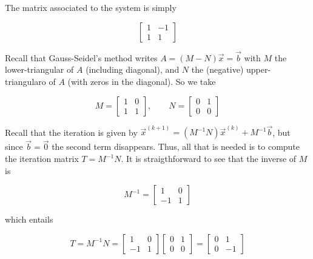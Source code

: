 \documentclass[12pt]{article}
\theoremstyle{definition}
\begin{document}
The matrix associated to the system is simply 

\begin{equation*}
    \begin{bmatrix} 
        1 & -1 \\ 
        1 & 1
    \end{bmatrix} 
\end{equation*}

Recall that Gauss-Seidel's method writes $A = (M-N)\overrightarrow{x} =
\overrightarrow{b}$ with $M$ the lower-triangular of $A$ (including diagonal),
and $N$ the (negative) upper-triangularo of $A$ (with zeros in the diagonal). So we take 

\begin{equation*}
    M = \begin{bmatrix} 
        1 & 0 \\ 
        1 & 1
    \end{bmatrix}, \qquad N = \begin{bmatrix} 
        0 & 1 \\ 
        0 & 0
    \end{bmatrix} 
\end{equation*}

Recall that the iteration is given by $\overrightarrow{x}^{(k+1)} = (M^{-1}
N)\overrightarrow{x}^{(k)} + M^{-1}\overrightarrow{b}$, but since
$\overrightarrow{b} = \overrightarrow{0}$ the second term disappears. Thus, all
that is needed is to compute the iteration matrix $T = M^{-1}N$. It is
straigthforward to see that the inverse of $M$ is 

\begin{equation*}
    M^{-1} = \begin{bmatrix} 
        1 & 0 \\ 
        -1 & 1
    \end{bmatrix} 
\end{equation*}

which entails 

\begin{equation*}
    T = M^{-1}N = \begin{bmatrix} 
        1 & 0 \\ 
        -1 & 1
    \end{bmatrix} \begin{bmatrix} 
        0 & 1 \\ 
        0 & 0
    \end{bmatrix} = \begin{bmatrix} 
        0 & 1 \\ 
        0 & -1
    \end{bmatrix} 
\end{equation*}
\end{document}
